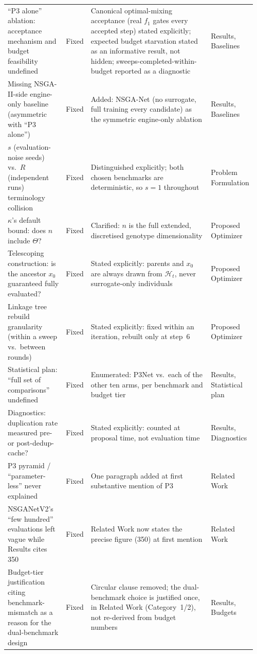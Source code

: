 \begin{longtable}{p{0.24\linewidth} p{0.08\linewidth} p{0.55\linewidth} p{0.09\linewidth}}
``P3 alone'' ablation: acceptance mechanism and budget feasibility undefined & Fixed & Canonical optimal-mixing acceptance (real $f_1$ gates every accepted step) stated explicitly; expected budget starvation stated as an informative result, not hidden; sweeps-completed-within-budget reported as a diagnostic & Results, Baselines \\
Missing NSGA-II-side engine-only baseline (asymmetric with ``P3 alone'') & Fixed & Added: NSGA-Net (no surrogate, full training every candidate) as the symmetric engine-only ablation & Results, Baselines \\
$s$ (evaluation-noise seeds) vs.\ $R$ (independent runs) terminology collision & Fixed & Distinguished explicitly; both chosen benchmarks are deterministic, so $s=1$ throughout & Problem Formulation \\
$\kappa$'s default bound: does $n$ include $\Theta$? & Fixed & Clarified: $n$ is the full extended, discretised genotype dimensionality & Proposed Optimizer \\
Telescoping construction: is the ancestor $x_0$ guaranteed fully evaluated? & Fixed & Stated explicitly: parents and $x_0$ are always drawn from $\mathcal{H}_t$, never surrogate-only individuals & Proposed Optimizer \\
Linkage tree rebuild granularity (within a sweep vs.\ between rounds) & Fixed & Stated explicitly: fixed within an iteration, rebuilt only at step~6 & Proposed Optimizer \\
Statistical plan: ``full set of comparisons'' undefined & Fixed & Enumerated: P3Net vs.\ each of the other ten arms, per benchmark and budget tier & Results, Statistical plan \\
Diagnostics: duplication rate measured pre- or post-dedup-cache? & Fixed & Stated explicitly: counted at proposal time, not evaluation time & Results, Diagnostics \\
P3 pyramid / ``parameter-less'' never explained & Fixed & One paragraph added at first substantive mention of P3 & Related Work \\
NSGANetV2's ``few hundred'' evaluations left vague while Results cites 350 & Fixed & Related Work now states the precise figure (350) at first mention & Related Work \\
Budget-tier justification citing benchmark-mismatch as a reason for the dual-benchmark design & Fixed & Circular clause removed; the dual-benchmark choice is justified once, in Related Work (Category~1/2), not re-derived from budget numbers & Results, Budgets \\

\end{longtable}
